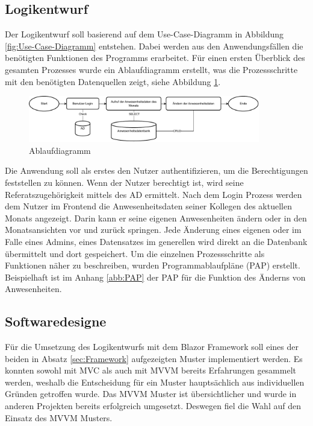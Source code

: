 \subsection{Logikentwurf}
\label{sec:Logikentwurf}
Der Logikentwurf soll basierend auf dem Use-Case-Diagramm in Abbildung \ref{fig:Use-Case-Diagramm} entstehen. Dabei werden aus den Anwendungsfällen die benötigten Funktionen des Programms erarbeitet. Für einen ersten Überblick des gesamten Prozesses wurde ein Ablaufdiagramm erstellt, was die Prozessschritte mit den benötigten Datenquellen zeigt, siehe Abbildung \ref{abb:Flow}.

\begin{figure}[htb]
    \centering
    \includegraphics[width=0.9\textwidth,angle=0]{abb/Flow-Diagramm.drawio.pdf}
    \caption[Ablaufdiagramm]{Ablaufdiagramm}
    \label{abb:Flow}
\end{figure}

Die Anwendung soll als erstes den Nutzer authentifizieren, um die Berechtigungen feststellen zu können. Wenn der Nutzer berechtigt ist, wird seine Referatszugehörigkeit mittels des AD ermittelt. Nach dem Login Prozess werden dem Nutzer im Frontend die Anwesenheitsdaten seiner Kollegen des aktuellen Monats angezeigt. Darin kann er seine eigenen Anwesenheiten ändern oder in den Monatsansichten vor und zurück springen. Jede Änderung eines eigenen oder im Falle eines Admins, eines Datensatzes im generellen wird direkt an die Datenbank übermittelt und dort gespeichert. Um die einzelnen Prozessschritte als Funktionen näher zu beschreiben, wurden Programmablaufpläne (PAP) erstellt. Beispielhaft ist im Anhang \ref{abb:PAP} der PAP für die Funktion des Änderns von Anwesenheiten.

\subsection{Softwaredesigne}
\label{sec:Softwaredesigne}

Für die Umsetzung des Logikentwurfs mit dem Blazor Framework soll eines der beiden in Absatz \ref{sec:Framework}  aufgezeigten Muster implementiert werden. Es konnten sowohl mit MVC als auch mit MVVM bereits Erfahrungen gesammelt werden, weshalb  die Entscheidung für ein Muster hauptsächlich aus individuellen Gründen getroffen wurde. Das MVVM Muster ist übersichtlicher und wurde in anderen Projekten bereits erfolgreich umgesetzt. Deswegen fiel die Wahl auf den Einsatz des MVVM Musters.

